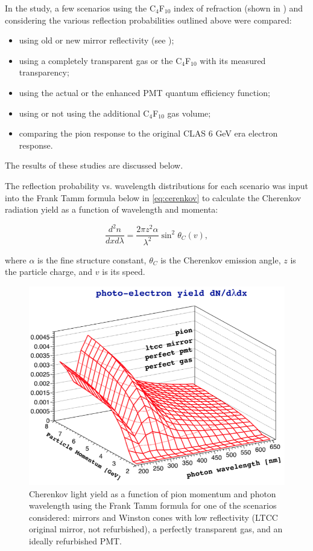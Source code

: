 In the study, a few scenarios using the C$_4$F$_{10}$ index of refraction (shown in )
and considering the various reflection probabilities outlined above  were compared:

\begin{itemize}
	\item using old or new mirror reflectivity (see );
	\item using a completely transparent gas or the C$_4$F$_{10}$ with its measured transparency;
	\item using the actual or the enhanced PMT quantum efficiency function;
	\item using or not using the additional C$_4$F$_{10}$ gas volume;
	\item comparing the pion response to the original CLAS 6 GeV era electron response.
\end{itemize}
\noindent
The results of these studies are discussed below.

The reflection probability vs. wavelength distributions for each scenario was input into the Frank\textendash
Tamm formula \cite{Frank:1937fk} below in \ref{eq:cerenkov} to calculate the Cherenkov radiation yield as a function of wavelength
and momenta:

\begin{equation}
  \label{eq:cerenkov}
  \frac{d^2n}{dxd\lambda} = \frac{2\pi z^2\alpha}{\lambda^2}\sin^2{\theta_C(v)},
\end{equation}

\noindent
where $\alpha$ is the fine structure constant, $\theta_C$ is the Cherenkov emission angle, $z$ is the particle
charge, and $v$ is its speed.

\begin{figure}
	\centering
	\includegraphics[width=0.98\columnwidth, height=0.75\columnwidth]{img/photonYieldStudy.png}
	\caption{Cherenkov light yield as a function of pion momentum and photon wavelength using the Frank\textendash
          Tamm formula for one of the scenarios considered: mirrors and Winston cones with low reflectivity (LTCC
          original mirror, not refurbished), a perfectly transparent gas, and an ideally refurbished PMT.}
	\label{fig:photonYieldStudy}
\end{figure}

